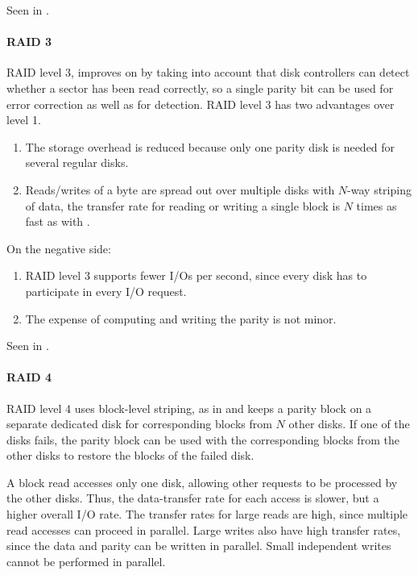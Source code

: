Seen in .

\paragraph{RAID 3}\label{par:RAID_3}
RAID level 3, improves on  by taking into account that disk controllers can detect whether a sector has been read correctly, so a single parity bit can be used for error correction as well as for detection.
RAID level 3 has two advantages over level 1.
\begin{enumerate}[noitemsep]
\item The storage overhead is reduced because only one parity disk is needed for several regular
disks.
\item Reads/writes of a byte are spread out over multiple disks with $N$-way striping of data, the transfer rate for reading or writing a single block is $N$ times as fast as with .
\end{enumerate}

On the negative side:
\begin{enumerate}[noitemsep]
\item RAID level 3 supports fewer I/Os per second, since every disk has to participate in every I/O request.
\item The expense of computing and writing the parity is not minor.
\end{enumerate}

Seen in .

\paragraph{RAID 4}\label{par:RAID_4}
RAID level 4 uses block-level striping, as in  and keeps a parity block on a separate dedicated disk for corresponding blocks from $N$ other disks.
If one of the disks fails, the parity block can be used with the corresponding blocks from the other disks to restore the blocks of the failed disk.

A block read accesses only one disk, allowing other requests to be processed by the other disks.
Thus, the data-transfer rate for each access is slower, but a higher overall I/O rate.
The transfer rates for large reads are high, since multiple read accesses can proceed in parallel.
Large writes also have high transfer rates, since the data and parity can be written in parallel.
Small independent writes cannot be performed in parallel.

